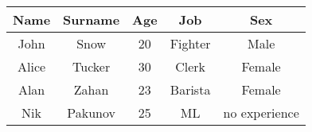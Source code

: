 \documentclass{article}
\begin{document}
\begin{table}[h!]
\centering
\begin{tabular}{|c|c|c|c|c|}
\hline
Name & Surname & Age & Job & Sex \\
\hline
John & Snow & 20 & Fighter & Male \\
\hline
Alice & Tucker & 30 & Clerk & Female \\
\hline
Alan & Zahan & 23 & Barista & Female \\
\hline
Nik & Pakunov & 25 & ML & no experience \\
\hline
\end{tabular}
\end{table}
\end{document}
